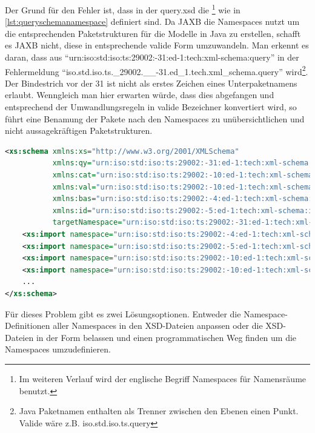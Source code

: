 Der Grund für den Fehler ist, dass in der query.xsd die \footnote{Im weiteren Verlauf wird der englische Begriff Namespaces für Namensräume benutzt.} wie in  \autoref{lst:queryschemanamespace} definiert sind. Da JAXB die \Glspl{Namespace} nutzt um die entsprechenden Paketstrukturen für die Modelle in Java zu erstellen, schafft es JAXB nicht, diese in entsprechende valide Form umzuwandeln. Man erkennt es daran, dass aus 
\enquote{urn:iso:std:iso:ts:29002:-31:ed-1:tech:xml-schema:query} 
in der Fehlermeldung 
\enquote{iso.std.iso.ts.\_29002.\_\_-31.ed\_1.tech.xml\_schema.query} wird\footnote{Java Paketnamen enthalten als Trenner zwischen den Ebenen einen Punkt. Valide wäre z.B. iso.std.iso.ts.query}.
Der Bindestrich vor der 31 ist nicht als erstes Zeichen eines Unterpaketnamens erlaubt. Wenngleich man hier erwarten würde, dass dies abgefangen und entsprechend der Umwandlungsregeln in valide Bezeichner konvertiert wird, so führt eine Benamung der Pakete nach den \Glspl{Namespace} zu unübersichtlichen und nicht aussagekräftigen Paketstrukturen. 

\begin{lstlisting}[caption=query.xsd Namespace Definitionen, language=XML, label=lst:queryschemanamespace]
<xs:schema xmlns:xs="http://www.w3.org/2001/XMLSchema"
           xmlns:qy="urn:iso:std:iso:ts:29002:-31:ed-1:tech:xml-schema:query"
           xmlns:cat="urn:iso:std:iso:ts:29002:-10:ed-1:tech:xml-schema:catalogue"
           xmlns:val="urn:iso:std:iso:ts:29002:-10:ed-1:tech:xml-schema:value"
           xmlns:bas="urn:iso:std:iso:ts:29002:-4:ed-1:tech:xml-schema:basic"
           xmlns:id="urn:iso:std:iso:ts:29002:-5:ed-1:tech:xml-schema:identifier"
           targetNamespace="urn:iso:std:iso:ts:29002:-31:ed-1:tech:xml-schema:query" elementFormDefault="qualified">
    <xs:import namespace="urn:iso:std:iso:ts:29002:-4:ed-1:tech:xml-schema:basic" schemaLocation="basic.xsd"/>
    <xs:import namespace="urn:iso:std:iso:ts:29002:-5:ed-1:tech:xml-schema:identifier" schemaLocation="identifier.xsd"/>
    <xs:import namespace="urn:iso:std:iso:ts:29002:-10:ed-1:tech:xml-schema:catalogue" schemaLocation="catalogue.xsd"/>
    <xs:import namespace="urn:iso:std:iso:ts:29002:-10:ed-1:tech:xml-schema:value" schemaLocation="value.xsd"/>
    ...
</xs:schema>    
\end{lstlisting}

Für dieses Problem gibt es zwei Lösungsoptionen. Entweder die \gls{Namespace}-Definitionen aller \Glspl{Namespace} in den XSD-Dateien anpassen oder die XSD-Dateien in der Form belassen und einen programmatischen Weg finden um die \Glspl{Namespace} umzudefinieren. 

